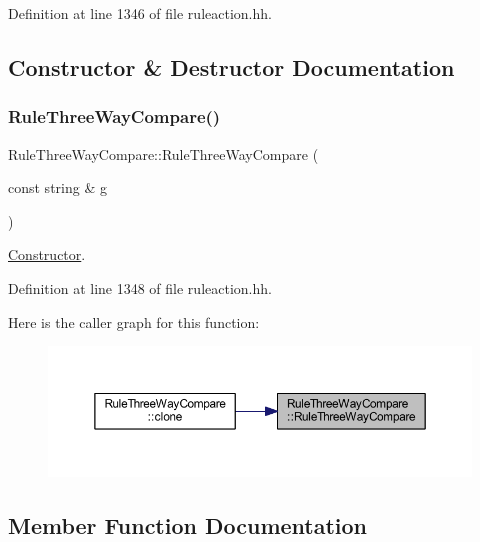 Definition at line 1346 of file ruleaction.\+hh.



\subsection{Constructor \& Destructor Documentation}
\mbox{\label{class_rule_three_way_compare_a125e24e9907f0b53b74ca311c0960265}} 
\subsubsection{\texorpdfstring{RuleThreeWayCompare()}{RuleThreeWayCompare()}}
{\footnotesize\ttfamily Rule\+Three\+Way\+Compare\+::\+Rule\+Three\+Way\+Compare (\begin{DoxyParamCaption}\item[{const string \&}]{g }\end{DoxyParamCaption})\hspace{0.3cm}{\ttfamily [inline]}}



\mbox{\hyperlink{class_constructor}{Constructor}}. 



Definition at line 1348 of file ruleaction.\+hh.

Here is the caller graph for this function\+:
\nopagebreak
\begin{figure}[H]
\begin{center}
\leavevmode
\includegraphics[width=350pt]{class_rule_three_way_compare_a125e24e9907f0b53b74ca311c0960265_icgraph}
\end{center}
\end{figure}


\subsection{Member Function Documentation}
\mbox{\label{class_rule_three_way_compare_af661958d83d132fd75bf054671649a27}} 
